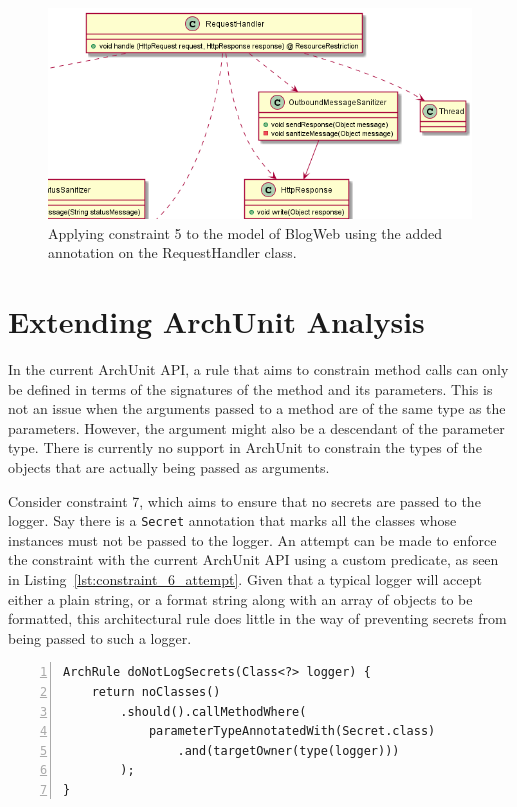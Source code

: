 \begin{figure}
    \centering
    \includegraphics[width=\linewidth]{figure/toyexamples/resource_restriction.png}
    \caption{Applying constraint 5 to the model of BlogWeb using the added annotation on the RequestHandler class.}
    \label{fig:toy_resource_restriction}
\end{figure}




\section{Extending ArchUnit Analysis}

In the current ArchUnit API, a rule that aims to constrain method calls can only be defined in terms of the signatures of the method and its parameters. This is not an issue when the arguments passed to a method are of the same type as the parameters. However, the argument might also be a descendant of the parameter type. There is currently no support in ArchUnit to constrain the types of the objects that are actually being passed as arguments.

Consider constraint 7, which aims to ensure that no secrets are passed to the logger. Say there is a \texttt{Secret} annotation that marks all the classes whose instances must not be passed to the logger. An attempt can be made to enforce the constraint with the current ArchUnit API using a custom predicate, as seen in Listing~\ref{lst:constraint_6_attempt}. Given that a typical logger will accept either a plain string, or a format string along with an array of objects to be formatted, this architectural rule does little in the way of preventing secrets from being passed to such a logger.

\begin{minipage}{\linewidth}
\begin{lstlisting}[caption={A first attempt to implement constraint 7.}, captionpos=b, label=lst:constraint_6_attempt, numbers=left]
ArchRule doNotLogSecrets(Class<?> logger) {
    return noClasses()
        .should().callMethodWhere(
            parameterTypeAnnotatedWith(Secret.class)
                .and(targetOwner(type(logger)))
        );
}
\end{lstlisting}
\end{minipage}

